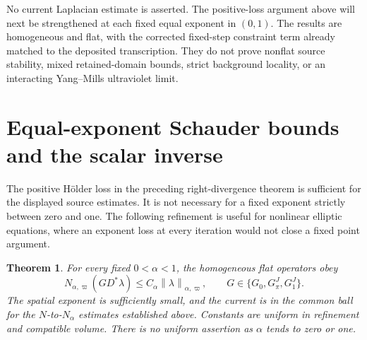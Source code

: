 \documentclass[11pt]{article}
\newtheorem{theorem}{Theorem}[section]
\theoremstyle{remark}
\newcommand{\norm}[1]{\left\|#1\right\|}
\begin{document}
No current Laplacian estimate is asserted. The positive-loss argument
above will next be strengthened at each fixed equal exponent in
$(0,1)$. The results are homogeneous and flat,
with the corrected fixed-step constraint term already matched to
the deposited transcription. They do not prove nonflat source
stability, mixed retained-domain bounds, strict background locality,
or an interacting Yang--Mills ultraviolet limit.

\section{Equal-exponent Schauder bounds and the scalar inverse}
\label{ss-section}

The positive H\"older loss in the preceding right-divergence
theorem is sufficient for the displayed source estimates. It is
not necessary for a fixed exponent strictly between zero and one.
The following refinement is useful for nonlinear elliptic equations,
where an exponent loss at every iteration would not close a fixed
point argument.

\begin{theorem}\label{ss-equal-exponent}
For every fixed $0<\alpha<1$, the homogeneous flat operators obey
\begin{equation}\label{ss-main}
 N_{\alpha,\varpi}(GD^*\lambda)
       \le C_\alpha\norm{\lambda}_{\alpha,\varpi},
 \qquad G\in\{G_0,G_\pi^J,G_1^J\}.
\end{equation}
The spatial exponent is sufficiently small, and the current is in
the common ball for the $N$-to-$N_\alpha$ estimates established
above. Constants are uniform in refinement and compatible volume.
There is no uniform assertion as $\alpha$ tends to zero or one.
\end{theorem}
\end{document}
